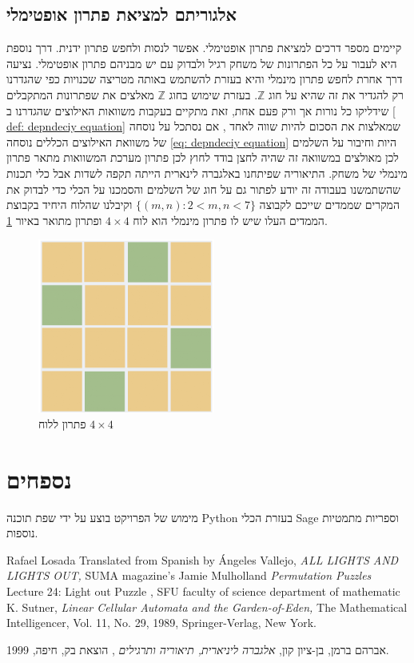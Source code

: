 \documentclass[12pt,leqno]{article}
\theoremstyle{theoremdd}
\begin{document}
\subsection{אלגוריתם למציאת פתרון אופטימלי}
קיימים מספר דרכים למציאת פתרון אופטימלי.
אפשר לנסות ולחפש פתרון ידנית.
דרך נוספת היא לעבור על כל הפתרונות של משחק רגיל ולבדוק עם יש מבניהם פתרון 
אופטימלי.
נציעה דרך אחרת לחפש פתרון 
מינמלי
והיא בעזרת להשתמש באותה מטריצה שכנויות כפי שהגדרנו רק להגדיר 
את זה שהיא על חוג 
$\mathbb{Z}$.
בעזרת שימוש בחוג 
$\mathbb{Z}$
מאלצים את שפתרונות המתקבלים
שידליקו כל נורות אך ורק פעם אחת,
זאת מתקיים בעקבות 
משוואות האילוצים שהגדרנו ב
\ref{ def: depndeciy equation}
שמאלצות את הסכום להיות שווה לאחד
,
אם נסתכל על נוסחה של משוואת האילוצים הכללים 
נוסחה
\ref{eq: depndeciy equation}
היות וחיבור על השלמים לכן 
מאולצים במשוואה זה שהיה לחצן בודד לחוץ 
לכן פתרון מערכת המשוואות מתאר פתרון 
מינמלי של משחק.
התיאוריה שפיתחנו באלגברה לינארית הייתה תקפה לשדות 
אבל כלי תכנות שהשתמשנו
בעבודה זה יודע לפתור גם על חוג של השלמים 
והסמכנו על הכלי כדי לבדוק את המקרים
שממדים שייכם לקבוצה 
$\{ (m,n) : 2 < m,n <7 \}$
וקיבלנו שהלוח
היחיד בקבוצת הממדים העלו שיש לו פתרון מינמלי 
הוא
לוח 
$4 \times 4$
ופתרון מתואר באיור 
\ref{fig:4x4_have_min_sol}.

\begin{figure}[ht]
    \caption{פתרון ללוח 
    $4 \times 4$}
    \label{fig:4x4_have_min_sol}
    \centering
    \includegraphics[width=.3\textwidth,keepaspectratio]{images/4x4_sol.PNG}
\end{figure}

\newpage
\section{נספחים}
מימוש של הפרויקט בוצע על ידי 
שפת תוכנה 
{Python}
בעזרת הכלי
{Sage}
וספריות מתמטיות נוספות.

\newpage
\begin{thebibliography}{99}
\begin{english}
Rafael Losada
Translated from Spanish by Ángeles Vallejo,
\emph{
    ALL LIGHTS AND LIGHTS OUT,
}
SUMA magazine’s 
Jamie Mulholland
\emph{
    Permutation Puzzles
}
Lecture 24: Light out Puzzle , SFU faculty of science department of mathematic
K. Sutner, \emph{Linear Cellular Automata and the Garden-of-Eden,} The Mathematical Intelligencer, Vol. 11, No. 29, 1989, Springer-Verlag, New York.		
\end{english}
אברהם ברמן, בן-ציון קון, 
\emph{
אלגברה ליניארית, תיאוריה ותרגילים
}
, הוצאת בק, חיפה, 1999.
\end{thebibliography}
\end{document}
